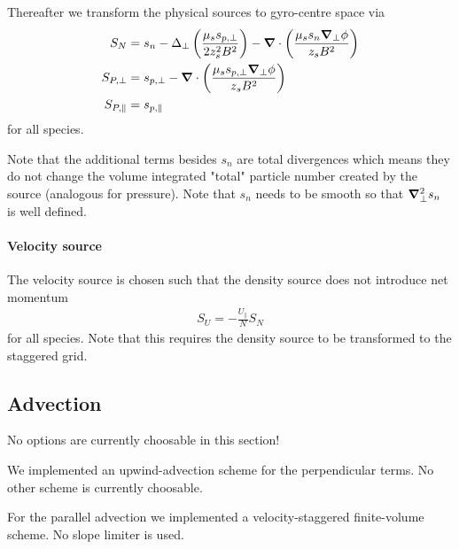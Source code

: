 Thereafter we transform the physical sources to gyro-centre space via
\begin{align}
   S_N &= s_n - \Delta_\perp \left( \frac{\mu_s s_{p,\perp}}{2z_s^2B^2}\right) - {\boldsymbol{\nabla}}\cdot\left( \frac{\mu_s s_n {\boldsymbol{\nabla}}_\perp \phi}{z_sB^2}\right) \\
   S_{P,\perp} &= s_{p,\perp} - {\boldsymbol{\nabla}}\cdot\left( \frac{\mu_s s_{p,\perp}{\boldsymbol{\nabla}}_\perp \phi}{z_sB^2}\right) \\
   S_{P,\parallel} &= s_{p,\parallel}
\end{align}
for all species.

Note that the additional terms besides $s_{n}$ are total divergences which
means they do not change the volume integrated "total" particle number created
by the source (analogous for pressure).  Note that $s_{n}$ needs to be smooth so that ${\boldsymbol{\nabla}}_{\perp}^2 s_{n}$
is well defined.

\paragraph{Velocity source}
The velocity source is chosen such that the density source does not introduce
net momentum
\begin{align}
    S_U = -\frac{U_\parallel}{N} S_N
    \label{eq:velocity_source}
\end{align}
for all species. Note that this requires the density source to be transformed to the staggered grid.

\subsection{Advection}
No options are currently choosable in this section!

We implemented an upwind-advection scheme for the perpendicular terms.
No other scheme is currently choosable.

For the parallel advection we implemented a velocity-staggered finite-volume
scheme. No slope limiter is used.
